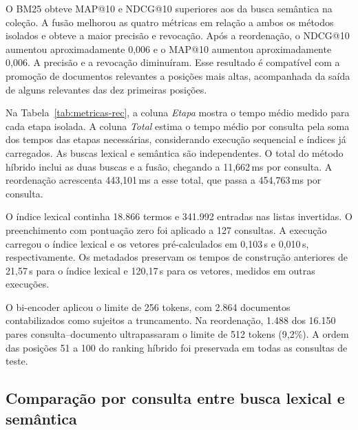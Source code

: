 \documentclass[12pt]{article}
\begin{document}
O BM25 obteve MAP@10 e NDCG@10 superiores aos da busca semântica na
coleção. A fusão melhorou as quatro métricas em relação a ambos os métodos
isolados e obteve a maior precisão e revocação. Após a reordenação, o
NDCG@10 aumentou aproximadamente 0,006 e o MAP@10 aumentou aproximadamente
0,006. A precisão e a revocação diminuíram. Esse resultado é compatível
com a promoção de documentos relevantes a posições mais altas, acompanhada
da saída de alguns relevantes das dez primeiras posições.

Na Tabela~\ref{tab:metricas-rec}, a coluna \emph{Etapa} mostra o tempo médio
medido para cada etapa isolada. A coluna \emph{Total} estima o tempo médio
por consulta pela soma dos tempos das etapas necessárias, considerando
execução sequencial e índices já carregados. As buscas lexical e
semântica são independentes. O total do método híbrido inclui as duas
buscas e a fusão, chegando a 11,662\,ms por consulta. A reordenação
acrescenta 443,101\,ms a esse total, que passa a 454,763\,ms por consulta.

O índice lexical continha 18.866 termos e 341.992 entradas
nas listas invertidas. O preenchimento com pontuação zero foi aplicado
a 127 consultas. A execução carregou o índice lexical e os vetores
pré-calculados em 0,103\,s e 0,010\,s, respectivamente. Os metadados
preservam os tempos de construção anteriores de 21,57\,s para o índice
lexical e 120,17\,s para os vetores, medidos em outras execuções.

O bi-encoder aplicou o limite de 256 tokens, com 2.864 documentos
contabilizados como sujeitos a truncamento. Na reordenação, 1.488 dos
16.150 pares consulta--documento ultrapassaram o limite de 512 tokens
(9,2\%). A ordem das posições 51 a 100 do ranking híbrido foi preservada
em todas as consultas de teste.

\subsection{Comparação por consulta entre busca lexical e semântica}
\end{document}
